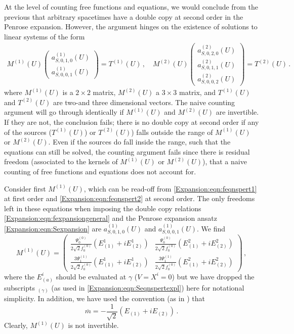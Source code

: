 At the level of counting free functions and equations, we would conclude from the previous that arbitrary spacetimes have a double copy at second order in the Penrose expansion. However, the argument hinges on the existence of solutions to linear systems of the form
\begin{equation}\label{Expansion:eqn:Meqns}
\begin{aligned}
M^{(1)}(U)\begin{pmatrix}
a^{(1)}_{S,0, 1,0}(U) \\ a^{(1)}_{S,0, 0,1}(U) 
\end{pmatrix} = T^{(1)}(U)  \, , \quad	M^{(2)}(U)\begin{pmatrix}
a^{(2)}_{S,0, 2,0}(U) \\ a^{(2)}_{S,0, 1,1}(U) \\  a^{(2)}_{S,0, 0,2}(U)
\end{pmatrix} = T^{(2)}(U) \, .
\end{aligned}
\end{equation}
where $M^{(1)}(U)$ is a  $2\times 2$ matrix, $M^{(2)}(U)$ a  $3\times 3$ matrix, and $T^{(1)}(U)$ and $T^{(2)}(U)$ are two-and three dimensional vectors. The naive counting argument will go through identically if $M^{(1)}(U)$ and $M^{(2)}(U)$ are invertible. If they are not, the conclusion fails; there is no double copy at second order if any of the sources ($T^{(1)}(U)$) or $T^{(2)}(U)$) falls outside the range of $M^{(1)}(U)$ or  $M^{(2)}(U)$. Even if the sources do fall inside the range, such that the equations can still be solved, the counting argument fails since there is residual freedom (associated to the kernels of $M^{(1)}(U)$ or $M^{(2)}(U)$), that a naive counting of free functions and equations does not account for.

Consider first $M^{(1)}(U)$, which can be read-off from \eqref{Expansion:eqn:feqnspert1} at first order and \eqref{Expansion:eqn:feqnspert2} at second order. The only freedoms left in these equations when imposing the double copy relations \eqref{Expansion:eqn:fexpansiongeneral} and the Penrose expansion ansatz \eqref{Expansion:eqn:Sexpansion} are $a^{(1)}_{S,0, 1,0}(U)$ and $a^{(1)}_{S,0, 0,1}(U)$. We find
\begin{equation}\label{Expansion:eqn:M1matrix}
M^{(1)}(U) = \begin{pmatrix}
\frac{\Psi^{(0)}_0}{2\sqrt{2} f_0^{(0)}} \left(E^1_{(1)}+i E^1_{(2)}\right) & \frac{\Psi^{(0)}_0}{2\sqrt{2} f_0^{(0)}} \left(E^2_{(1)}+i E^2_{(2)}\right) \\
\frac{3\Psi^{(1)}_1}{2\sqrt{2} f_0^{(0)}}\left(E^1_{(1)}+i E^1_{(2)}\right) & \frac{3\Psi^{(1)}_1}{2\sqrt{2} f_0^{(0)}} \left(E^2_{(1)}+i E^2_{(2)}\right) 
\end{pmatrix} \, ,
\end{equation}
where the $E^i_{(a)}$ should be evaluated at $\gamma$ ($V=X^i=0$) but we have dropped the subscripts ${}_{(\gamma)}$ (as used in \eqref{Expansion:eqn:Seqnspertexpl}) here for notational simplicity. In addition, we have used the convention (as in \cite{Chawla:2024mse}) that
\begin{equation}
\overline{m} = -\frac{1}{\sqrt{2}}\left(E_{(1)}+i E_{(2)}\right)  \, .
\end{equation}
Clearly, $M^{(1)}(U)$ is not invertible.

